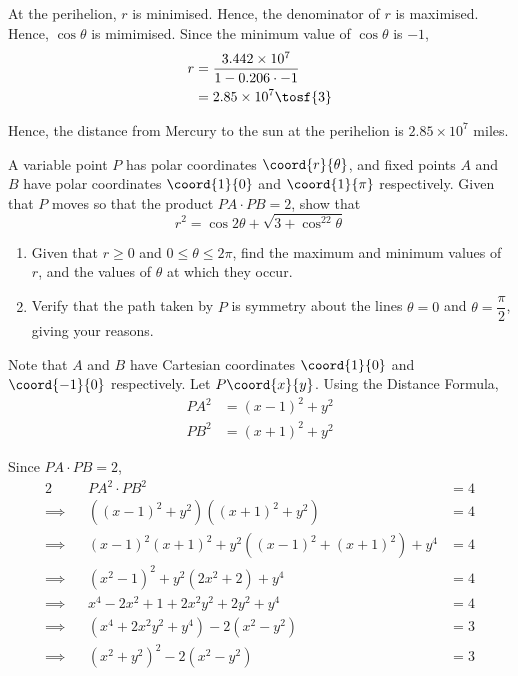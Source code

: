 \documentclass{jhwhw}
\begin{document}
        At the perihelion, $r$ is minimised. Hence, the denominator of $r$ is maximised. Hence, $\cos \theta$ is mimimised. Since the minimum value of $\cos \theta$ is $-1$,
        \begin{align*}
            r &= \dfrac{3.442 \times 10^7}{1 - 0.206\cdot-1}\\
            &= 2.85 \times 10^7 \tosf{3}
        \end{align*}

        Hence, the distance from Mercury to the sun at the perihelion is $2.85 \times 10^7$ miles.


    \problem{}
        A variable point $P$ has polar coordinates $\coord{r}{\theta}$, and fixed points $A$ and $B$ have polar coordinates $\coord{1}{0}$ and $\coord{1}{\pi}$ respectively. Given that $P$ moves so that the product $PA\cdot PB = 2$, show that
        \begin{equation*}
            r^2 = \cos2\theta + \sqrt{3 + \cos^22\theta}
        \end{equation*}

        \begin{enumerate}
            \item Given that $r \geq 0$ and $0 \leq \theta \leq 2\pi$, find the maximum and minimum values of $r$, and the values of $\theta$ at which they occur.
            \item Verify that the path taken by $P$ is symmetry about the lines $\theta = 0$ and $\theta = \dfrac{\pi}{2}$, giving your reasons.
        \end{enumerate}

    \solution
        Note that $A$ and $B$ have Cartesian coordinates $\coord{1}{0}$ and $\coord{-1}{0}$ respectively. Let $P\coord{x}{y}$. Using the Distance Formula,
        \begin{align*}
            PA^2 &= (x-1)^2 + y^2\\
            PB^2 &= (x+1)^2 + y^2
        \end{align*}

        Since $PA \cdot PB = 2$,
        \begin{alignat*}{2}
            &&PA^2 \cdot PB^2 &= 4\\
            \implies&&\left((x-1)^2 + y^2\right)\left((x+1)^2 + y^2\right) &= 4\\
            \implies&&(x-1)^2(x+1)^2 + y^2\left((x-1)^2 + (x+1)^2\right) + y^4 &= 4\\
            \implies&&\left(x^2 - 1\right)^2 + y^2\left(2x^2 + 2\right) + y^4 &= 4\\
            \implies&&x^4 - 2x^2 + 1 + 2x^2y^2 + 2y^2 + y^4 &= 4\\
            \implies&&\left(x^4 + 2x^2y^2 + y^4\right) - 2\left(x^2 - y^2\right) &= 3\\
            \implies&&\left(x^2 + y^2\right)^2 - 2\left(x^2 - y^2\right) &= 3
        \end{alignat*}
\end{document}
